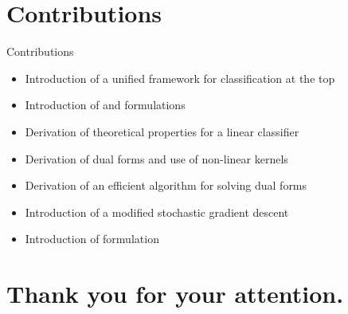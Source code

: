\documentclass[10pt, aspectratio=169]{beamer}
\begin{document}
\section{Contributions}

\begin{frame}{Contributions}
  \begin{itemize}
    \item Introduction of a unified framework for classification at the top
    \item Introduction of \PatMat and \PatMatNP formulations
    \item Derivation of theoretical properties for a linear classifier
    \item Derivation of dual forms and use of non-linear kernels
    \item Derivation of an efficient algorithm for solving dual forms
    \item Introduction of a modified stochastic gradient descent
    \item Introduction of \DeepTopPush formulation
  \end{itemize}
\end{frame}

\section{Thank you for your attention.}
\end{document}
